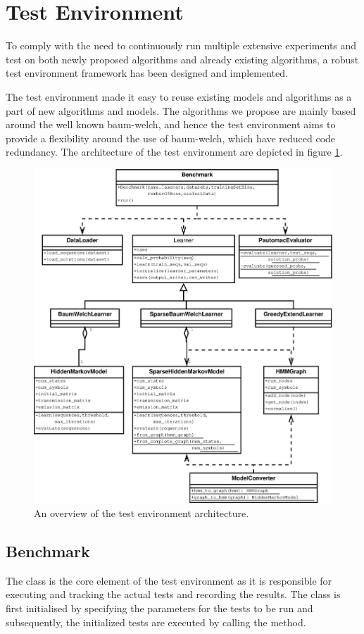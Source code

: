 \section{Test Environment}
To comply with the need to continuously run multiple extensive experiments and test on both newly proposed algorithms and already existing algorithms, a robust test environment framework has been designed and implemented.

The test environment made it easy to reuse existing models and algorithms as a part of new algorithms and models. 
The algorithms we propose are mainly based around the well known \gls{baum-welch}, and hence the test environment aims to provide a flexibility around the use of \gls{baum-welch}, which have reduced code redundancy.
The architecture of the test environment are depicted in figure \ref{fig:testenvironment}.

\begin{figure}[!htb]
\centering
\includegraphics[scale=.4]{pictures/test-environment-overview.eps}
\caption{An overview of the test environment architecture.}
\label{fig:testenvironment}
\end{figure}

\subsection{Benchmark}
The  class is the core element of the test environment as it is responsible for executing and tracking the actual tests and recording the results. The  class is first initialised by specifying the parameters for the tests to be run and subsequently, the initialized tests are executed by calling the  method.

